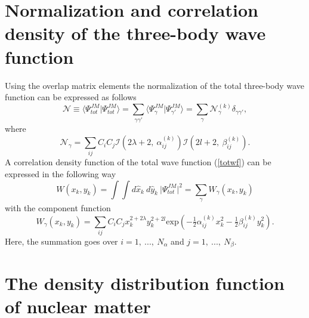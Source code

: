 \documentclass[
12pt, %
oneside, %
english, %
onehalfspacing, %
onehalfspacing, %
headsepline, %
]{MastersDoctoralThesis} %
\begin{document}
\section{Normalization and correlation density of the three-body wave function}
Using the overlap matrix elements the normalization of the total three-body wave function can be expressed as follows
\begin{equation}
\mathcal{N} \equiv  \langle \Psi^{JM}_{tot} \vert \Psi^{JM}_{tot} \rangle = \sum_{\gamma \gamma'}
 \langle \Psi^{JM}_{\gamma} \vert \Psi^{JM}_{\gamma'} \rangle = \sum_{\gamma} \mathcal{N}^{(k)}_{\gamma} \delta_{\gamma \gamma'},    
\end{equation}
where 
\begin{equation}
\mathcal{N}_{\gamma} =  \sum_{ij} C_i C_j 
 \mathcal{I} \left( 2\lambda+2,~\alpha_{ij}^{(k)} \right)
 \mathcal{I} \left( 2l+2,~\beta_{ij}^{(k)} \right).
\end{equation}
A correlation density function of the total wave function (\ref{totwf})  can be expressed in the following way
\begin{equation}
W\left( x_k,y_k \right) =
\int \int d\hat{x}_k~ d\hat{y}_k~ \vert \Psi^{JM}_{tot} \vert^2
=
 \sum_{\gamma} W_{\gamma}\left( x_k,y_k \right)
\end{equation}
with the component function 
\begin{equation}
W_{\gamma}\left( x_k,y_k \right) = \sum_{ij} C_i C_j x^{2+2\lambda}_k y^{2+2l}_k \text{exp}\left( - \tfrac{1}{2} \alpha^{(k)}_{ij} x_k^2 -  \tfrac{1}{2} \beta^{(k)}_{ij} y_k^2 \right) .
\end{equation}
Here, the summation goes over $i=1,~...,~N_\alpha$ and $j=1,~...,~N_\beta$.


\section{The density distribution function of nuclear matter}
\label{section_density_function}
\end{document}
